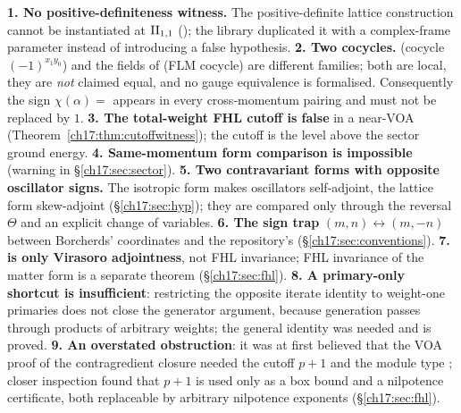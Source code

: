\begin{warning}
\textbf{1. No positive-definiteness witness.}  The positive-definite lattice construction cannot be instantiated at
${\mathrm{II}_{1,1}}$ (); the library duplicated it with a complex-frame parameter instead of
introducing a false hypothesis.  \textbf{2. Two cocycles.}   (cocycle $(-1)^{x_1y_0}$) and the
fields of  (FLM cocycle) are different families; both are local, they are \emph{not} claimed equal, and
no gauge equivalence is formalised.  Consequently the sign
$\chi(\alpha)=$  appears in every cross-momentum pairing and must not be replaced by $1$.  \textbf{3. The
total-weight FHL cutoff is false} in a near-VOA (Theorem~\ref{ch17:thm:cutoffwitness}); the cutoff is the level above the
sector ground energy.  \textbf{4. Same-momentum form comparison is impossible} (warning in \S\ref{ch17:sec:sector}).
\textbf{5. Two contravariant forms with opposite oscillator signs.} The isotropic form makes oscillators self-adjoint, the
lattice form skew-adjoint (\S\ref{ch17:sec:hyp}); they are compared only through the reversal $\Theta$ and an explicit
change of variables.  \textbf{6. The sign trap} $(m,n)\leftrightarrow(m,-n)$ between Borcherds' coordinates and the repository's
(\S\ref{ch17:sec:conventions}).  \textbf{7.  is only Virasoro adjointness}, not FHL invariance;
FHL invariance of the matter form is a separate theorem (\S\ref{ch17:sec:fhl}).  \textbf{8. A primary-only shortcut is
insufficient}: restricting the opposite iterate identity to weight-one primaries does not close the generator argument,
because generation passes through products of arbitrary weights; the general identity
was needed and is proved.  \textbf{9. An overstated obstruction}: it was at first believed that the VOA proof of the
contragredient closure needed the cutoff $p+1$ and the module type ; closer inspection found
that $p+1$ is used only as a box bound and a nilpotence certificate, both replaceable by arbitrary nilpotence exponents
(\S\ref{ch17:sec:fhl}).
\end{warning}

